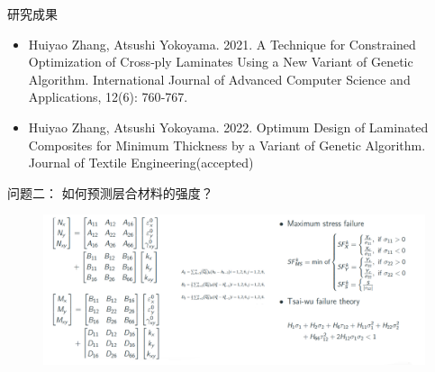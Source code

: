 \documentclass{beamer}
\begin{document}
\begin{frame}{研究成果}
	\begin{center}
		\begin{itemize}
			\item Huiyao Zhang, Atsushi Yokoyama. 2021. A Technique for Constrained Optimization of Cross‑ply Laminates Using a New
				Variant of Genetic Algorithm. International Journal of Advanced Computer Science and Applications, 12(6): 760‑767.
			\item Huiyao Zhang, Atsushi Yokoyama. 2022. Optimum Design of Laminated Composites for Minimum Thickness by a Variant
				of Genetic Algorithm. Journal of Textile Engineering(accepted)
		\end{itemize}
	\end{center}
\end{frame}





\begin{frame}{问题二： 如何预测层合材料的强度？ }
	\begin{center}
		\begin{figure}
			\includegraphics[width=1\textwidth]{fig/part3/formula_for_stenght_calculation.png}
		\end{figure}
	\end{center}
\end{frame}
\end{document}
